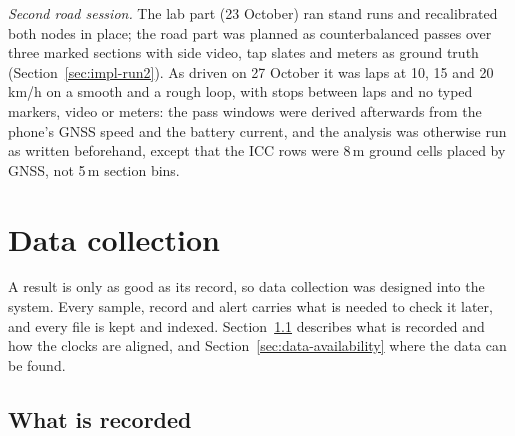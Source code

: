 \emph{Second road session.} The lab part (23 October) ran stand runs and recalibrated both nodes in place; the road part was planned as counterbalanced passes over three marked sections with side video, tap slates and meters as ground truth (Section~\ref{sec:impl-run2}). As driven on 27 October it was laps at 10, 15 and 20\,km/h on a smooth and a rough loop, with stops between laps and no typed markers, video or meters: the pass windows were derived afterwards from the phone's GNSS speed and the battery current, and the analysis was otherwise run as written beforehand, except that the ICC rows were 8\,m ground cells placed by GNSS, not 5\,m section bins.

\section{Data collection}
\label{sec:data-collection}

A result is only as good as its record, so data collection was designed into the system. Every sample, record and alert carries what is needed to check it later, and every file is kept and indexed. Section~\ref{sec:what-recorded} describes what is recorded and how the clocks are aligned, and Section~\ref{sec:data-availability} where the data can be found.

\subsection{What is recorded}
\label{sec:what-recorded}

